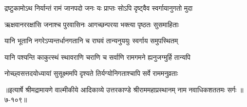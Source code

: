 \twolineshloka
{द्रष्टुकामोऽथ निर्यान्तं रामं जानपदो जनः}
{यः प्राप्तः सोऽपि दृष्ट्वैव स्वर्गायानुगतो मुदा} %

\twolineshloka
{ऋक्षवानररक्षांसि जनाश्च पुरवासिनः}
{आगच्छन्परया भक्त्या पृष्ठतः सुसमाहिताः} %

\twolineshloka
{यानि भूतानि नगरेऽप्यन्तर्धानगतानि च}
{राघवं तान्यनुययुः स्वर्गाय समुपस्थितम्} %

\twolineshloka
{यानि पश्यन्ति काकुत्स्थं स्थावराणि चराणि च}
{सर्वाणि रामगमने ह्यनुजग्मुर्हि तान्यपि} %

\twolineshloka
{नोच्छ्वसत्तदयोध्यायां सुसूक्ष्ममपि दृश्यते}
{तिर्यग्योनिगताश्चापि सर्वे राममनुव्रताः} %


॥इत्यार्षे श्रीमद्रामायणे वाल्मीकीये आदिकाव्ये उत्तरकाण्डे श्रीराममहाप्रस्थानम् नाम नवाधिकशततमः सर्गः ॥७-१०९॥
